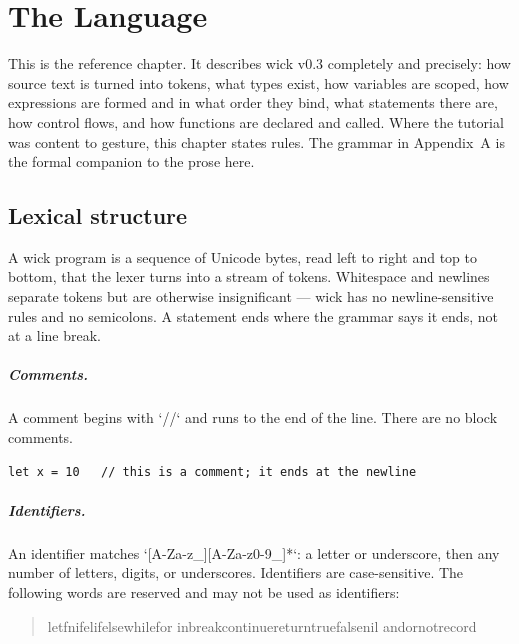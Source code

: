 \chapter{The Language}

This is the reference chapter. It describes wick v0.3 completely and
precisely: how source text is turned into tokens, what types exist, how
variables are scoped, how expressions are formed and in what order they bind,
what statements there are, how control flows, and how functions are declared
and called. Where the tutorial was content to gesture, this chapter states
rules. The grammar in Appendix~A is the formal companion to the prose here.

\section{Lexical structure}

A wick program is a sequence of Unicode bytes, read left to right and top to
bottom, that the lexer turns into a stream of tokens. Whitespace and newlines
separate tokens but are otherwise insignificant --- wick has no
newline-sensitive rules and no semicolons. A statement ends where the grammar
says it ends, not at a line break.

\paragraph{Comments.} A comment begins with `//` and runs to the end of the
line. There are no block comments.

\begin{lstlisting}[language=wick]
let x = 10   // this is a comment; it ends at the newline
\end{lstlisting}

\paragraph{Identifiers.} An identifier matches `[A-Za-z_][A-Za-z0-9_]*`: a
letter or underscore, then any number of letters, digits, or underscores.
Identifiers are case-sensitive. The following words are reserved and may not
be used as identifiers:

\begin{quote}
\ttfamily let\quad fn\quad if\quad elif\quad else\quad while\quad for\quad
in\quad break\quad continue\quad return\quad true\quad false\quad nil\quad
and\quad or\quad not\quad record
\end{quote}

